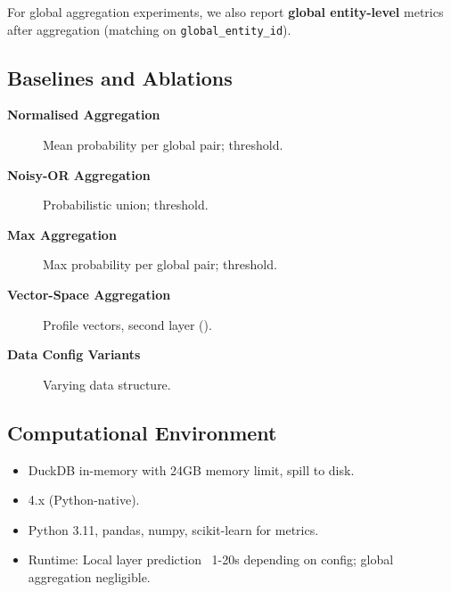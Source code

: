 For global aggregation experiments, we also report \textbf{global entity-level} metrics after aggregation (matching on \texttt{global\_entity\_id}).

\subsection{Baselines and Ablations}
\label{sec:baselines}

\begin{description}
	\item[\textbf{Normalised Aggregation}] Mean probability per global pair; threshold.
	\item[\textbf{Noisy-OR Aggregation}] Probabilistic union; threshold.
	\item[\textbf{Max Aggregation}] Max probability per global pair; threshold.
	\item[\textbf{Vector-Space Aggregation}] Profile vectors, second \splink{} layer ().
	\item[\textbf{Data Config Variants}] Varying data structure.
\end{description}

\subsection{Computational Environment}
\label{sec:compute_env}
\begin{itemize}
	\item DuckDB in-memory with 24GB memory limit, spill to disk.
	\item \splink{} 4.x (Python-native).
	\item Python 3.11, pandas, numpy, scikit-learn for metrics.
	\item Runtime: Local layer prediction ~1-20s depending on config; global aggregation negligible.
\end{itemize}
